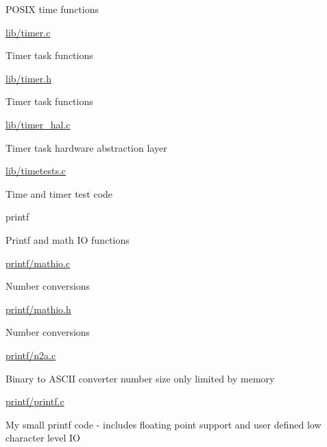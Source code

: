 \begin{DoxyPre}
\begin{DoxyItemize}
\begin{DoxyItemize}
\begin{DoxyItemize}
\item POSIX time functions
\end{DoxyItemize}
\item \hyperlink{timer_8c}{lib/timer.c}
\begin{DoxyItemize}
\item Timer task functions
\end{DoxyItemize}
\item \hyperlink{timer_8h}{lib/timer.h}
\begin{DoxyItemize}
\item Timer task functions
\end{DoxyItemize}
\item \hyperlink{timer__hal_8c}{lib/timer\_hal.c}
\begin{DoxyItemize}
\item Timer task hardware abstraction layer
\end{DoxyItemize}
\item \hyperlink{timetests_8c}{lib/timetests.c}
\begin{DoxyItemize}
\item Time and timer test code
\end{DoxyItemize}
\end{DoxyItemize}
\item printf
\begin{DoxyItemize}
\item Printf and math IO functions
\item \hyperlink{mathio_8c}{printf/mathio.c}
\begin{DoxyItemize}
\item Number conversions
\end{DoxyItemize}
\item \hyperlink{mathio_8h}{printf/mathio.h}
\begin{DoxyItemize}
\item Number conversions
\end{DoxyItemize}
\item \hyperlink{n2a_8c}{printf/n2a.c}
\begin{DoxyItemize}
\item Binary to ASCII converter number size only limited by memory
\end{DoxyItemize}
\item \hyperlink{printf_8c}{printf/printf.c}
\begin{DoxyItemize}
\item My small printf code - includes floating point support and user defined low character level IO

\end{DoxyItemize}
\end{DoxyItemize}
\end{DoxyItemize}
\end{DoxyPre}
